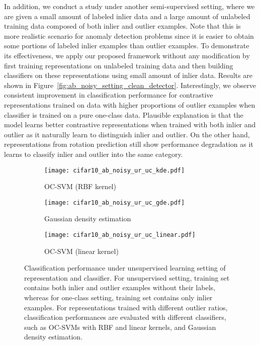 \documentclass{article} \usepackage{iclr2021_conference,times}
\begin{document}
In addition, we conduct a study under another semi-supervised setting, where we are given a small amount of labeled inlier data and a large amount of unlabeled training data composed of both inlier and outlier examples. Note that this is more realistic scenario for anomaly detection problems since it is easier to obtain some portions of labeled inlier examples than outlier examples. To demonstrate its effectiveness, we apply our proposed framework without any modification by first training representations on unlabeled training data and then building classifiers on these representations using small amount of inlier data. Results are shown in Figure~\ref{fig:ab_noisy_setting_clean_detector}. Interestingly, we observe consistent improvement in classification performance for contrastive representations trained on data with higher proportions of outlier examples when classifier is trained on a pure one-class data. Plausible explanation is that the model learns better contrastive representations when trained with both inlier and outlier as it naturally learn to distinguish inlier and outlier. On the other hand, representations from rotation prediction still show performance degradation as it learns to classify inlier and outlier into the same category.

\begin{figure}[t]
    \centering
    \begin{subfigure}{.32\textwidth}
        \centering
        \texttt{[image: cifar10\_ab\_noisy\_ur\_uc\_kde.pdf]}
        \caption{OC-SVM (RBF kernel)}
        \label{fig:ab_noisy_ur_uc_kde}
    \end{subfigure}
    \begin{subfigure}{.32\textwidth}
        \centering
        \texttt{[image: cifar10\_ab\_noisy\_ur\_uc\_gde.pdf]}
        \caption{Gaussian density estimation}
        \label{fig:ab_noisy_ur_uc_gde}
    \end{subfigure}
    \begin{subfigure}{.32\textwidth}
        \centering
        \texttt{[image: cifar10\_ab\_noisy\_ur\_uc\_linear.pdf]}
        \caption{OC-SVM (linear kernel)}
        \label{fig:ab_noisy_ur_uc_linear}
    \end{subfigure}
    \caption{Classification performance under unsupervised learning setting of representation and classifier. For unsupervised setting, training set contains both inlier and outlier examples without their labels, whereas for one-class setting, training set contains only inlier examples. For representations trained with different outlier ratios, classification performances are evaluated with different classifiers, such as OC-SVMs with RBF and linear kernels, and Gaussian density estimation.}
    \label{fig:ab_noisy_setting}
\end{figure}
\end{document}
